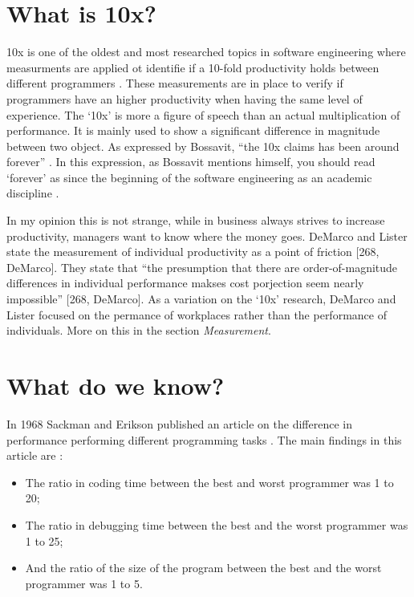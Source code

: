 \section*{What is 10x?}

10x is one of the oldest and most researched topics in software engineering where measurments are applied ot identifie if a 10-fold productivity holds between different programmers \autocite[567]{MAKING_SOFTWARE}.
These measurements are in place to verify if programmers have an higher productivity when having the same level of experience.
The `10x' is more a figure of speech than an actual multiplication of performance.
It is mainly used to show a significant difference in magnitude between two object.
As expressed by Bossavit, ``the 10x claims has been around forever'' \autocite[37]{bossavit2013leprechauns}.
In this expression, as Bossavit mentions himself, you should read `forever' as since the beginning of the software engineering as an academic discipline \autocite[38-39]{bossavit2013leprechauns}.

In my opinion this is not strange, while in business always strives to increase productivity, managers want to know where the money goes.
DeMarco and Lister state the measurement of individual productivity as a point of friction [268, DeMarco].
They state that ``the presumption that there are order-of-magnitude differences in individual performance makses cost porjection seem nearly impossible'' [268, DeMarco].
As a variation on the `10x' research, DeMarco and Lister focused on the permance of workplaces rather than the performance of individuals.
More on this in the section \textit{Measurement}.

\section*{What do we know?}

In 1968 Sackman and Erikson published an article on the difference in performance performing different programming tasks \autocite{sackman1968exploratory}.
The main findings in this article are \autocite{sackman1968exploratory} \autocite[567]{MAKING_SOFTWARE}:
\begin{itemize}[noitemsep]
\setlength{\itemindent}{-.2in}
\item The ratio in coding time between the best and worst programmer was 1 to 20;
\item The ratio in debugging time between the best and the worst programmer was 1 to 25;
\item And the ratio of the size of the program between the best and the worst programmer was 1 to 5.
\end{itemize}

